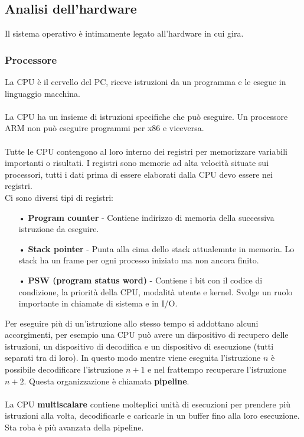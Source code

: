 \documentclass{article}
\begin{document}
\newpage
\subsection{Analisi dell'hardware}
Il sistema operativo è intimamente legato all'hardware in cui gira.
\subsubsection{Processore}
La CPU è il cervello del PC, riceve istruzioni da un programma e le esegue in linguaggio macchina.
\\\\
La CPU ha un insieme di istruzioni specifiche che può eseguire. Un processore ARM non può eseguire programmi per x86 e viceversa.
\\\\
Tutte le CPU contengono al loro interno dei registri per memorizzare variabili importanti o risultati. I registri sono memorie ad 
alta velocità situate sui processori, tutti i dati prima di essere elaborati dalla CPU devo essere nei registri.
\\
Ci sono diversi tipi di registri:
\begin{enumerate}
   \item[•] \textbf{Program counter} - Contiene indirizzo di memoria della successiva istruzione da eseguire.
   \item[•] \textbf{Stack pointer} - Punta alla cima dello stack attualemnte in memoria. Lo stack ha un frame per ogni processo iniziato ma non ancora finito.
   \item[•] \textbf{PSW (program status word)} - Contiene i bit con il codice di condizione, la priorità della CPU, modalità utente e kernel. Svolge un ruolo importante in chiamate di sistema e in I/O. 
\end{enumerate}
Per eseguire più di un'istruzione allo stesso tempo si addottano alcuni accorgimenti, per esempio una CPU può avere 
un dispositivo di recupero delle istruzioni, un dispositivo di decodifica e un dispositivo di esecuzione (tutti separati tra di loro).
In questo modo mentre viene eseguita l'istruzione $n$ è possibile decodificare l'istruzione $n+1$ e nel frattempo recuperare l'istruzione $n+2$.
Questa organizzazione è chiamata \textbf{pipeline}.
\\
\\
La CPU \textbf{multiscalare} contiene molteplici unità di esecuzioni per prendere più istruzioni alla volta, decodificarle e caricarle in un 
buffer fino alla loro esecuzione. Sta roba è più avanzata della pipeline.
\end{document}
